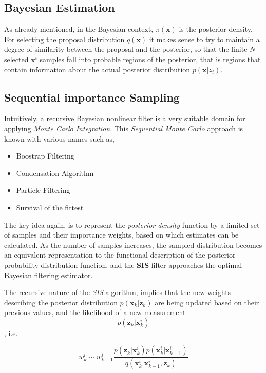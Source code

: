 \subsection{Bayesian Estimation}

As already mentioned, in the Bayesian context, $\pi (\mathbf{x})$ is the posterior density. For selecting the proposal distribution $q(\mathbf{x})$ it makes sense to try to maintain a degree of similarity between the proposal and the posterior, so that the finite $N$ selected $\mathbf{x}^i$ samples fall into probable regions of the posterior, that is regions that contain information about the actual posterior distribution $p(\mathbf{x} | z_i)$.
\subsection{Sequential importance Sampling}


Intuitively, a recursive Bayesian nonlinear filter is a very suitable domain for applying \emph{Monte Carlo Integration}. This \emph{Sequential Monte Carlo} approach is known with various names\cite{Ristic2004} such as,

\begin{itemize}
	\item Boostrap Filtering
	\item Condensation Algorithm
	\item Particle Filtering
	\item Survival of the fittest
\end{itemize}

The key idea again, is to represent the \emph{posterior density} function by a limited set of samples and their importance weights, based on which estimates can be calculated. As the number of samples increases, the sampled distribution becomes an equivalent representation to the functional description of the posterior probability distribution function, and the \textbf{SIS} filter approaches the optimal Bayesian filtering estimator\cite{Ristic2004}.


The recursive nature of the \emph{SIS} algorithm, implies that the new weights describing the posterior distribution $p(\mathbf{x}_k | \mathbf{z}_k)$ are being updated based on their previous values, and the likelihood of a new measurement $$p(\mathbf{z}_k | \mathbf{x}_k^i)$$, i.e.

\begin{equation}\label{eq:SIS}
w_k^i \sim w_{k-1}^i \frac{p(\mathbf{z}_k | \mathbf{x}_k^i)p(\mathbf{x}_k^i | \mathbf{x}_{k-1}^i)}{q(\mathbf{x}_k^i | \mathbf{x}_{k-1}^i , \mathbf{z}_k)}
\end{equation}


